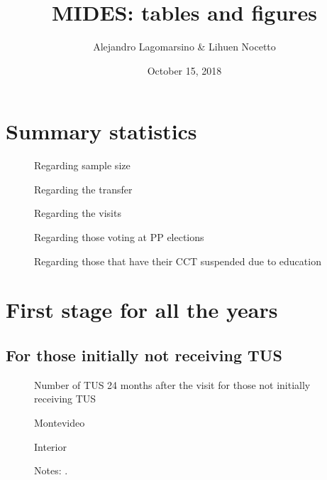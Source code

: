 \documentclass[12pt]{article}
\title{MIDES: tables and figures}
\author{Alejandro Lagomarsino \& Lihuen Nocetto}
\date{October 15, 2018}
\begin{document}
\maketitle	

\section{Summary statistics}
\begin{figure}[H]
\caption{Regarding sample size}

\centering
\label{fig:summStats1}
\end{figure}

\begin{figure}[H]
	\caption{Regarding the transfer}
	
	\centering
	\label{fig:summStats2}
\end{figure}

\begin{figure}[H]
	\caption{Regarding the visits}
	
	\centering
	\label{fig:summStats3}
\end{figure}

\begin{figure}[H]
	\caption{Regarding those voting at PP elections}
	
	\centering
	\label{fig:summStats4}
\end{figure}

\begin{figure}[H]
	\caption{Regarding those that have their CCT suspended due to education}
	
	\centering
	\label{fig:summStats5}
\end{figure}

\section{First stage for all the years}

\subsection{For those initially not receiving TUS}

\begin{figure}[H]%
	\caption{Number of TUS 24 months after the visit for those not initially receiving TUS}%
	\centering
	\caption*{ {Montevideo}}
	\qquad
	\caption*{Interior}
	\label{fig:first_stage_noTus_tus24}%
	\caption*{ {\footnotesize Notes: .}}
\end{figure}
\end{document}
